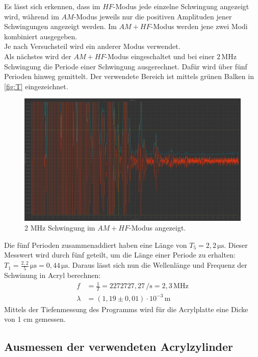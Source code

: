   Es lässt sich erkennen, dass im $HF$-Modus jede einzelne Schwingung angezeigt wird, während
  im $AM$-Modus jeweils nur die positiven Amplituden jener Schwingungen angezeigt werden. Im $AM + HF$-Modus
  werden jene zwei Modi kombiniert ausgegeben.\\
  Je nach Versuchsteil wird ein anderer Modus verwendet.\\
  Als nächstes wird der $AM + HF$-Modus eingeschaltet und bei einer $2 \, \si{\mega\hertz}$ Schwingung die Periode einer Schwingung
  ausgerechnet. Dafür wird über fünf Perioden hinweg gemittelt. Der verwendete Bereich ist mittels grünen Balken 
  in \autoref{fig:T} eingezeichnet.
  \begin{figure}
    \centering
    \includegraphics[width=15cm]{messwerte/Vorbereitung/T.png}
    \caption{2 MHz Schwingung im $AM + HF$-Modus angezeigt.}
    \label{fig:T}
  \end{figure}
  Die fünf Perioden zusammenaddiert haben eine Länge von $T_5 =2,2 \, \si{\micro\second}$. Dieser Messwert wird
  durch fünf geteilt, um die Länge einer Periode zu erhalten: $T_1 = \frac{2,2}{5} \, \si{\micro\second} = 0,44 \, \si{\micro\second}$.
  Daraus lässt sich nun die Wellenlänge und Frequenz der Schwinung in Acryl berechnen:
  \begin{align*}
    f &= \frac{1}{T} = 2 272 727,27 \, \si{\per\second} = 2,3 \, \mathrm{MHz}\\
    \lambda &= (1,19 \pm 0,01) \cdot 10^{-3} \, \si{\meter}
  \end{align*}
  Mittels der Tiefenmessung des Programms wird für die Acrylplatte eine Dicke von 1 cm gemessen.

\subsection{Ausmessen der verwendeten Acrylzylinder}

